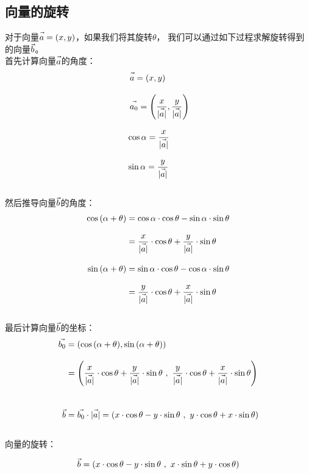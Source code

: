\documentclass[UTF8]{ctexart}
\let\nvec\vec
\def\vec#1{\nvec{\vphantom b\smash{#1}}}
\begin{document}
\subsection{向量的旋转}
    对于向量$\vec{a}=(x,y)$，如果我们将其旋转$\theta$，
    我们可以通过如下过程求解旋转得到的向量$\vec{b}$。\\[3mm]
    首先计算向量$\vec{a}$的角度：
    \setcounter{equation}{0}
    \begin{align}
        &~\vec{a}=(x,y)\\[3mm]
        &~\vec{a_0}=\left(\frac{x}{|\vec{a}|},\frac{y}{|\vec{a}|}\right)\\[3mm]
        &\cos{\alpha}=\frac{x}{|\vec{a}|}\\[3mm]
        &\sin{\alpha}=\frac{y}{|\vec{a}|}
    \end{align}\\
    然后推导向量$\vec{b}$的角度：
    \begin{align}
        \cos{(\alpha+\theta)}
        &=\cos{\alpha}\cdot\cos{\theta}-\sin{\alpha}\cdot\sin{\theta}\\[3mm]
        &=\frac{x}{|\vec{a}|}\cdot\cos{\theta}+\frac{y}{|\vec{a}|}\cdot\sin{\theta}\\[3mm]
        \sin{(\alpha+\theta)}
        &=\sin{\alpha}\cdot\cos{\theta}-\cos{\alpha}\cdot\sin{\theta}\\[3mm]
        &=\frac{y}{|\vec{a}|}\cdot\cos{\theta}+\frac{x}{|\vec{a}|}\cdot\sin{\theta}
    \end{align}\\
    最后计算向量$\vec{b}$的坐标：
    \begin{align}
        \vec{b_0}
        &=\left(\cos{(\alpha+\theta)},\sin{(\alpha+\theta)}\right)\\[3mm]
        &=\left(\frac{x}{|\vec{a}|}\cdot\cos{\theta}+\frac{y}{|\vec{a}|}\cdot\sin{\theta}\ ,\ \frac{y}{|\vec{a}|}\cdot\cos{\theta}+\frac{x}{|\vec{a}|}\cdot\sin{\theta}\right)\\[8mm]
        \vec{b}&=\vec{b_0}\cdot|\vec{a}|=\left(x\cdot\cos{\theta}-y\cdot\sin{\theta}\ ,\  y\cdot\cos{\theta}+x\cdot\sin{\theta}\right)
    \end{align}\\
    向量的旋转：
    \begin{large}
        \begin{equation*}
            \vec{b}=\left(x\cdot\cos{\theta}-y\cdot\sin{\theta}\ ,\  x\cdot\sin{\theta}+y\cdot\cos{\theta}\right)
        \end{equation*}
    \end{large}
\end{document}
